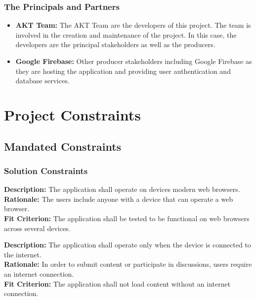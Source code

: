 \documentclass[12pt,fleqn]{article}
\begin{document}
\subsubsection* {The Principals and Partners}
\begin{itemize}
    \item \textbf{AKT Team: } The AKT Team are the developers of this project.  The team is involved in the creation and maintenance of the project.  In this case, the developers are the principal stakeholders as well as the producers.
    \item \textbf{Google Firebase: } Other producer stakeholders including Google Firebase as they are hosting the application and providing user authentication and database services.
\end{itemize}



\pagebreak

\section {Project Constraints}

\subsection {Mandated Constraints}
\subsubsection{Solution Constraints}
\begin{tcolorbox}
\textbf{Description:} The application shall operate on devices modern web browsers.
\\
\textbf{Rationale:} The users include anyone with a device that can operate a web browser.
\\
\textbf{Fit Criterion:} The application shall be tested to be functional on web browsers across several devices.
\end{tcolorbox}

\begin{tcolorbox}
\textbf{Description:} The application shall operate only when the device is connected to the internet.
\\
\textbf{Rationale:} In order to submit content or participate in discussions, users require an internet connection.
\\
\textbf{Fit Criterion:} The application shall not load content without an internet connection.
\end{tcolorbox}
\end{document}
